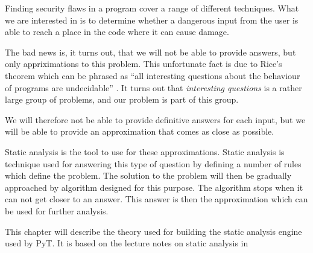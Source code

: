 Finding security flaws in a program cover a range of different techniques.
What we are interested in is to determine whether a dangerous input from the user is able to reach a place in the code where it can cause damage.


The bad news is, it turns out, that we will not be able to provide answers, but only appriximations to this problem.
This unfortunate fact is due to Rice's theorem which can be phrased as ``all interesting questions about the behaviour of programs are undecidable'' \citep[p.~3]{schwartzbach}.
It turns out that \emph{interesting questions} is a rather large group of problems, and our problem is part of this group.

We will therefore not be able to provide definitive answers for each input, but we will be able to provide an approximation that comes as close as possible.

Static analysis is the tool to use for these approximations.
Static analysis is technique used for answering this type of question by defining a number of rules which define the problem.
The solution to the problem will then be gradually approached by algorithm designed for this purpose.
The algorithm stops when it can not get closer to an answer.
This answer is then the approximation which can be used for further analysis.

This chapter will describe the theory used for building the static analysis engine used by PyT.
It is based on the lecture notes on static analysis in \citet{schwartzbach}
